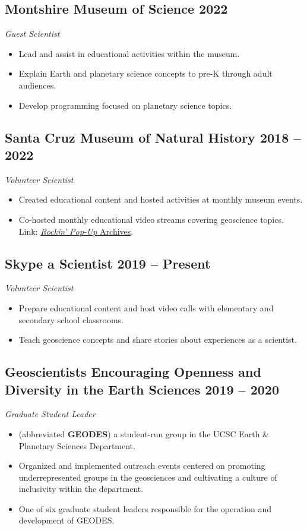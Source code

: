 \documentclass[10pt]{article}
\begin{document}
\subsection*{\textbf{Montshire Museum of Science} \hfill 2022}
\textit{Guest Scientist}
\begin{itemize}
\item Lead and assist in educational activities within the museum.
\item Explain Earth and planetary science concepts to pre-K through adult audiences.
\item Develop programming focused on planetary science topics.
\end{itemize}

\subsection*{\textbf{Santa Cruz Museum of Natural History} \hfill 2018 – 2022}
\textit{Volunteer Scientist}
\begin{itemize}
	\item Created educational content and hosted activities at monthly museum events.
	\item Co-hosted monthly educational video streams covering geoscience topics. \\
	Link: \href{https://www.santacruzmuseum.org/category/rockin-pop-up/}{\emph{Rockin' Pop-Up} Archives}.
\end{itemize}

\subsection*{\textbf{Skype a Scientist} \hfill 2019 – Present}
\textit{Volunteer Scientist}
\begin{itemize}
	\item Prepare educational content and host video calls with elementary and secondary school classrooms.
	\item Teach geoscience concepts and share stories about experiences as a scientist.
\end{itemize}

\subsection*{\textbf{Geoscientists Encouraging Openness and Diversity in the Earth Sciences} \hfill 2019 – 2020}
\textit{Graduate Student Leader}
\begin{itemize}
	\item (abbreviated \textbf{GEODES}) a student-run group in the UCSC Earth \& Planetary Sciences Department.
	\item Organized and implemented outreach events centered on promoting underrepresented groups in the geosciences and cultivating a culture of inclusivity within the department.
	\item One of six graduate student leaders responsible for the operation and development of GEODES.
\end{itemize}
\end{document}
